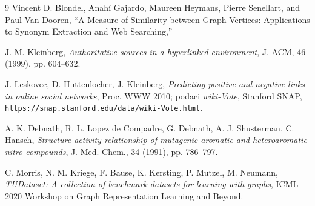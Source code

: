 \documentclass[12pt, letterpaper]{article}
\numberwithin{figure}{section}
\begin{document}
 \begin{thebibliography}{9}
Vincent D. Blondel, Anah{\'i} Gajardo, Maureen Heymans, Pierre Senellart, and Paul Van Dooren,
``A Measure of Similarity between Graph Vertices: Applications to Synonym Extraction and Web Searching,''
    
J. M. Kleinberg,
\textit{Authoritative sources in a hyperlinked environment},
J. ACM, 46 (1999), pp. 604--632.


J. Leskovec, D. Huttenlocher, J. Kleinberg,
\textit{Predicting positive and negative links in online social networks},
Proc. WWW 2010; podaci \textit{wiki-Vote}, Stanford SNAP, \texttt{https://snap.stanford.edu/data/wiki-Vote.html}.

A. K. Debnath, R. L. Lopez de Compadre, G. Debnath, A. J. Shusterman, C. Hansch,
\textit{Structure-activity relationship of mutagenic aromatic and heteroaromatic nitro compounds},
J. Med. Chem., 34 (1991), pp. 786--797.

C. Morris, N. M. Kriege, F. Bause, K. Kersting, P. Mutzel, M. Neumann,
\textit{TUDataset: A collection of benchmark datasets for learning with graphs},
ICML 2020 Workshop on Graph Representation Learning and Beyond.

\end{thebibliography}
\end{document}
